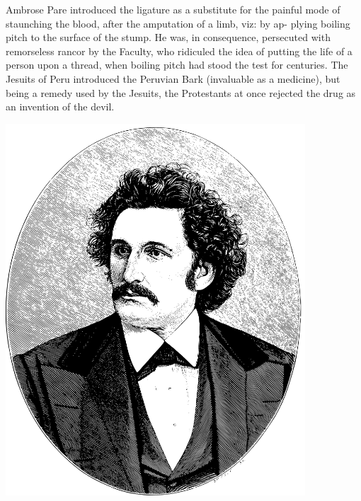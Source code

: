 \documentclass[10pt]{article}
\begin{document}
\begin{multicols}{3}
	Ambrose Pare introduced the ligature as a substitute for the painful\linebreak
	mode of staunching the blood, after the amputation of a limb, viz: by ap-\linebreak
	plying boiling pitch to the surface of the stump. He was, in consequence,\linebreak
	persecuted with remorseless rancor by the Faculty, who ridiculed the idea\linebreak
	of putting the life of a person upon a thread, when boiling pitch had stood\linebreak
	the test for centuries. The Jesuits of Peru introduced the Peruvian\linebreak
	Bark (invaluable as a medicine), but being a remedy used by the Jesuits,\linebreak
	the Protestants at once rejected the drug as an invention of the devil.

	\vspace{5mm}

	\begin{centering}
		\hspace{2mm}\includegraphics[width=112mm]{C_L_Blood.pdf}

		\vspace{2mm}


\end{centering}
\end{multicols}
\end{document}
